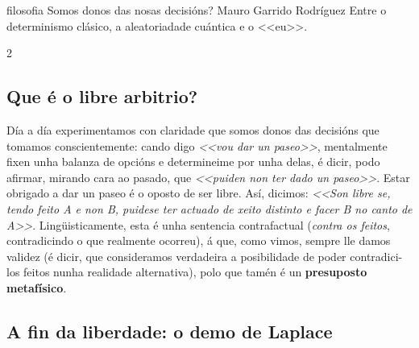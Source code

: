 \Artigo%
{filosofia}%
{Somos donos das nosas decisións?}%
{Mauro Garrido Rodríguez}%
{Entre o determinismo clásico, a aleatoriadade cuántica e o <<eu>>.}%

\begin{multicols}{2}

\subsection*{Que é o libre arbitrio?}

Día a día experimentamos con claridade que somos donos das decisións que
tomamos conscientemente: cando digo \textit{<<vou dar un paseo>>}, mentalmente
fixen unha balanza de opcións e determineime por unha delas, é dicir, podo
afirmar, mirando cara ao pasado, que \textit{<<puiden non ter dado un paseo>>}.
Estar obrigado a dar un paseo é o oposto de ser libre. Así, dicimos:
\textit{<<Son libre se, tendo feito A e non B, puidese ter actuado de xeito
distinto e facer B no canto de A>>}. Lingüisticamente, esta é unha sentencia
contrafactual (\textit{contra os feitos}, contradicindo o que realmente
ocorreu), á que, como vimos, sempre lle damos validez (é dicir, que
consideramos verdadeira a posibilidade de poder contradici-los feitos nunha
realidade alternativa), polo que tamén é un \textbf{presuposto metafísico}.

\subsection*{A fin da liberdade: o demo de Laplace}


\end{multicols}
